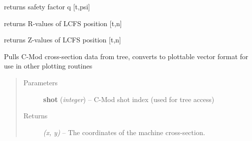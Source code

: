 \documentclass[letterpaper,10pt,english]{sphinxmanual}
\begin{document}
\begin{fulllineitems}
\begin{fulllineitems}
\end{fulllineitems}


\begin{fulllineitems}
\label{eqtools:eqtools.CModEFIT.CModEFITTree.getQProfile}
returns safety factor q {[}t,psi{]}

\end{fulllineitems}


\begin{fulllineitems}
\label{eqtools:eqtools.CModEFIT.CModEFITTree.getRLCFS}
returns R-values of LCFS position {[}t,n{]}

\end{fulllineitems}


\begin{fulllineitems}
\label{eqtools:eqtools.CModEFIT.CModEFITTree.getZLCFS}
returns Z-values of LCFS position {[}t,n{]}

\end{fulllineitems}


\begin{fulllineitems}
\label{eqtools:eqtools.CModEFIT.CModEFITTree.getMachineCrossSectionFull}
Pulls C-Mod cross-section data from tree, converts to plottable
vector format for use in other plotting routines
\begin{quote}\begin{description}
\item[{Parameters}] \leavevmode
\textbf{shot} (\emph{integer}) --
C-Mod shot index (used for tree access)

\item[{Returns}] \leavevmode
\emph{(x, y)} --
The coordinates of the machine cross-section.

\end{description}\end{quote}

\end{fulllineitems}


\end{fulllineitems}
\end{document}
